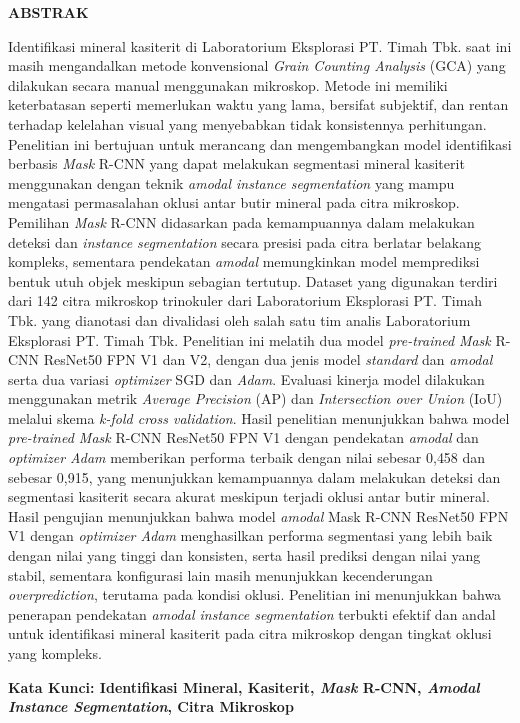 \clearpage
{}%
\thispagestyle{fancy}

\begin{center}
	\large \bfseries \MakeUppercase{Abstrak}\\
	\bigskip
	
	\normalsize \normalfont \justifying \singlespacing
	Identifikasi mineral kasiterit di Laboratorium Eksplorasi PT. Timah Tbk. saat ini masih mengandalkan metode konvensional \textit{Grain Counting Analysis} (GCA) yang dilakukan secara manual menggunakan mikroskop. Metode ini memiliki keterbatasan seperti memerlukan waktu yang lama, bersifat subjektif, dan rentan terhadap kelelahan visual yang menyebabkan tidak konsistennya perhitungan. Penelitian ini bertujuan untuk merancang dan mengembangkan model identifikasi berbasis \textit{Mask} R-CNN yang dapat melakukan segmentasi mineral kasiterit menggunakan dengan teknik \textit{amodal instance segmentation} yang mampu mengatasi permasalahan oklusi antar butir mineral pada citra mikroskop. Pemilihan \textit{Mask} R-CNN didasarkan pada kemampuannya dalam melakukan deteksi dan \textit{instance segmentation} secara presisi pada citra berlatar belakang kompleks, sementara pendekatan \textit{amodal} memungkinkan model memprediksi bentuk utuh objek meskipun sebagian tertutup. Dataset yang digunakan terdiri dari 142 citra mikroskop trinokuler dari Laboratorium Eksplorasi PT. Timah Tbk. yang dianotasi dan divalidasi oleh salah satu tim analis Laboratorium Eksplorasi PT. Timah Tbk. Penelitian ini melatih dua model \textit{pre-trained} \textit{Mask} R-CNN ResNet50 FPN V1 dan V2, dengan dua jenis model \textit{standard} dan \textit{amodal} serta dua variasi \textit{optimizer} SGD dan \textit{Adam}. Evaluasi kinerja model dilakukan menggunakan metrik \textit{Average Precision} (AP) dan \textit{Intersection over Union} (IoU) melalui skema \textit{k-fold cross validation}. Hasil penelitian menunjukkan bahwa model \textit{pre-trained Mask} R-CNN ResNet50 FPN V1 dengan pendekatan \textit{amodal} dan \textit{optimizer Adam} memberikan performa terbaik dengan nilai \APrangefiftyy sebesar 0{,}458 dan \IoUrangefiftyy sebesar 0{,}915, yang menunjukkan kemampuannya dalam melakukan deteksi dan segmentasi kasiterit secara akurat meskipun terjadi oklusi antar butir mineral. Hasil pengujian menunjukkan bahwa model \textit{amodal} Mask R-CNN ResNet50 FPN V1 dengan \textit{optimizer Adam} menghasilkan performa segmentasi yang lebih baik dengan nilai \IoUrangefiftyy yang tinggi dan konsisten, serta hasil prediksi dengan nilai \APrangefiftyy yang stabil, sementara konfigurasi lain masih menunjukkan kecenderungan \textit{overprediction}, terutama pada kondisi oklusi. Penelitian ini menunjukkan bahwa penerapan pendekatan \textit{amodal instance segmentation} terbukti efektif dan andal untuk identifikasi mineral kasiterit pada citra mikroskop dengan tingkat oklusi yang kompleks. \par

    \vspace{20pt}
	\raggedright \textbf{Kata Kunci: Identifikasi Mineral, Kasiterit, \textit{Mask} R-CNN, \textit{Amodal Instance Segmentation}, Citra Mikroskop}
	
	\vfill
	
\end{center}
\clearpage